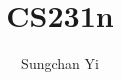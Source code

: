 \documentclass[12pt]{article}
\title{\textbf{CS231n}}
\author{Sungchan Yi}
\begin{document}
\maketitle

\tableofcontents
\pagebreak


\end{document}
